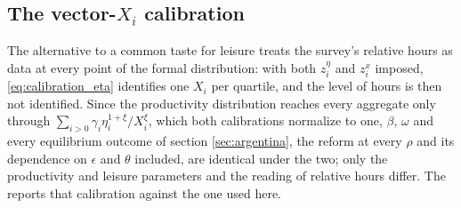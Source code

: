 \subsection{The vector-\texorpdfstring{$X_i$}{Xi} calibration}\label{app:EPH:vectorX}
The alternative to a common taste for leisure treats the survey's relative hours as data at every point of the formal distribution: with both $z_i^{\eta}$ and $z_i^{x}$ imposed, \eqref{eq:calibration_eta} identifies one $X_i$ per quartile, and the level of hours is then not identified. Since the productivity distribution reaches every aggregate only through $\sum_{i>0}\gamma_i\eta_i^{1+\xi}/X_i^{\xi}$, which both calibrations normalize to one, $\beta$, $\omega$ and every equilibrium outcome of section \ref{sec:argentina}, the reform at every $\rho$ and its dependence on $\epsilon$ and $\theta$ included, are identical under the two; only the productivity and leisure parameters and the reading of relative hours differ. The  reports that calibration against the one used here.


